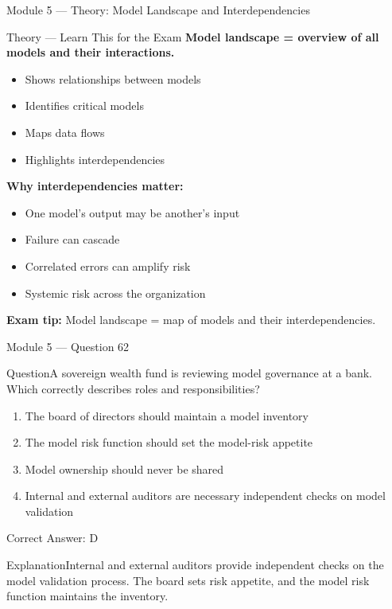 \documentclass[aspectratio=169,10pt]{beamer}
\newcommand{\question}[1]{\begin{block}{Question}#1\end{block}}
\newcommand{\options}[4]{%
	\begin{enumerate}[label=\Alph*.,leftmargin=*]
		\item #1
		\item #2
		\item #3
		\item #4
	\end{enumerate}
}
\newcommand{\answerbox}[1]{\begin{exampleblock}{Correct Answer: #1}\end{exampleblock}}
\newcommand{\explain}[1]{\begin{block}{Explanation}#1\end{block}}
\newcommand{\theory}[1]{%
	\begin{block}{Theory --- Learn This for the Exam}
		\small #1
	\end{block}
}
\begin{document}
	\begin{frame}{Module 5 --- Theory: Model Landscape and Interdependencies}
		\theory{
			\textbf{Model landscape = overview of all models and their interactions.}
			\begin{itemize}
				\item Shows relationships between models
				\item Identifies critical models
				\item Maps data flows
				\item Highlights interdependencies
			\end{itemize}
			\textbf{Why interdependencies matter:}
			\begin{itemize}
				\item One model's output may be another's input
				\item Failure can cascade
				\item Correlated errors can amplify risk
				\item Systemic risk across the organization
			\end{itemize}
			\textbf{Exam tip:} Model landscape = map of models and their interdependencies.
		}
	\end{frame}
	
	\begin{frame}{Module 5 --- Question 62}
		\question{A sovereign wealth fund is reviewing model governance at a bank. Which correctly describes roles and responsibilities?}
		\options{The board of directors should maintain a model inventory}{The model risk function should set the model-risk appetite}{Model ownership should never be shared}{Internal and external auditors are necessary independent checks on model validation}
		\answerbox{D}
		\explain{Internal and external auditors provide independent checks on the model validation process. The board sets risk appetite, and the model risk function maintains the inventory.}
	\end{frame}
	
\end{document}
